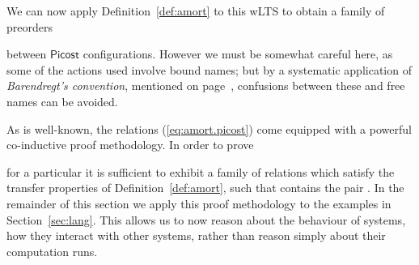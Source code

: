 \documentclass{LMCS}
\newcommand{\pfn}[1]{\mathsf{#1}}  \newcommand{\cfn}[1]{\mathsf{#1}}  \newcommand{\ownfnt}[1]{{\mathsf{#1}}}
\newcommand{\picost}{\ensuremath{\pfn{Picost}}\xspace}
\begin{document}
We can now apply Definition~\ref{def:amort} to this wLTS  to obtain 
a family of preorders

between \picost configurations. However we must be somewhat careful here, as some of
the actions used involve bound names; but by a systematic application of \emph{Barendregt's
convention}, mentioned on page~\pageref{barendregt}, confusions between these and free names
can be avoided.

As is well-known, the relations (\ref{eq:amort.picost}) come equipped with a powerful co-inductive
proof methodology. In order to prove 

for a particular  it is sufficient to exhibit a family of relations 
 which satisfy the transfer properties of 
Definition~\ref{def:amort}, such that  contains the pair 
. 
In the remainder of this section we apply this proof methodology to the 
examples in Section~\ref{sec:lang}. This allows us to   now reason about the behaviour of
systems, how they  interact with other systems, rather than reason simply about their computation
runs. 
\end{document}
